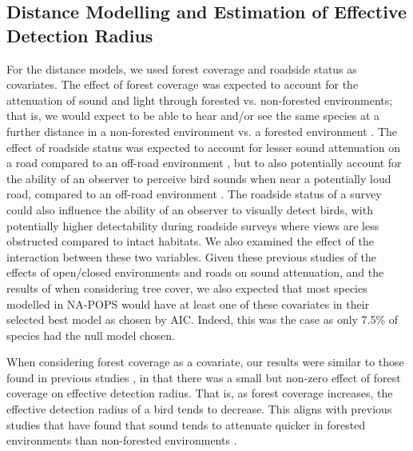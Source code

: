 \subsection{Distance Modelling and Estimation of Effective Detection Radius}

\par For the distance models, we used forest coverage and roadside status as covariates. The effect of forest coverage was expected to account for the attenuation of sound and light through forested vs. non-forested environments; that is, we would expect to be able to hear and/or see the same species at a further distance in a non-forested environment vs. a forested environment \citep{yip_sound_2017}. The effect of roadside status was expected to account for lesser sound attenuation on a road compared to an off-road environment \citep{yip_sound_2017}, but to also potentially account for the ability of an observer to perceive bird sounds when near a potentially loud road, compared to an off-road environment \citep{pacifici_effects_2008, cooke_road_2020}. The roadside status of a survey could also influence the ability of an observer to visually detect birds, with potentially higher detectability during roadside surveys where views are less obstructed compared to intact habitats. We also examined the effect of the interaction between these two variables. Given these previous studies of the effects of open/closed environments and roads on sound attenuation, and the results of \citet{solymos_calibrating_2013} when considering tree cover, we also expected that most species modelled in NA-POPS would have at least one of these covariates in their selected best model as chosen by AIC. Indeed, this was the case as only 7.5\% of species had the null model chosen.

\par When considering forest coverage as a covariate, our results were similar to those found in previous studies \citep{solymos_calibrating_2013, yip_sound_2017}, in that there was a small but non-zero effect of forest coverage on effective detection radius. That is, as forest coverage increases, the effective detection radius of a bird tends to decrease. This aligns with previous studies that have found that sound tends to attenuate quicker in forested environments than non-forested environments \citep{yip_sound_2017}.

